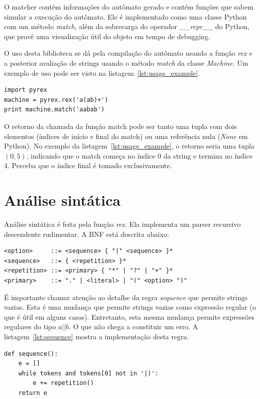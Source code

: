 \documentclass[a4paper,12pt,oneside,onecolumn]{uerj}
\begin{document}
O matcher contém informações do autômato gerado e contém funções que sabem simular a execução do autômato. Ele é implementado como uma classe Python com um método \emph{match}, além da sobrecarga do operador \emph{\_\_repr\_\_} do Python, que provê uma visualização útil do objeto em tempo de debugging.

O uso desta biblioteca se dá pela compilação do autômato usando a função \emph{rex} e a posterior avaliação de strings usando o método \emph{match} da classe \emph{Machine}. Um exemplo de uso pode ser visto na listagem~\ref{lst:usage_example}.

\vspace{0.5cm}
\begin{lstlisting}[caption={Exemplo de uso da biblioteca PyRex},label=lst:usage_example]
import pyrex
machine = pyrex.rex('a(ab)+')
print machine.match('aabab')
\end{lstlisting}

O retorno da chamada da função match pode ser tanto uma tupla com dois elementos (índices de início e final do match) ou uma referência nula (\emph{None} em Python). No exemplo da listagem~\ref{lst:usage_example}, o retorno seria uma tupla $(0, 5)$, indicando que o match começa no índice 0 da string e termina no índice 4. Perceba que o índice final é tomado exclusivamente.


\section{Análise sintática}

Análise sintática é feita pela função \emph{rex}. Ela implementa um parser recursivo descendente rudimentar. A BNF está descrita abaixo:

\begin{verbatim}
<option>     ::= <sequence> { "|" <sequence> }*
<sequence>   ::= { <repetition> }*
<repetition> ::= <primary> { "*" | "?" | "+" }*
<primary>    ::= "." | <literal> | "(" <option> ")"
\end{verbatim}

É importante chamar atenção ao detalhe da regra \emph{sequence} que permite strings vazias. Esta é uma mudança que permite strings vazias como expressão regular (o que é útil em alguns casos). Entretanto, esta mesma mudança permite expressões regulares do tipo $a||b$. O que não chega a constituir um erro. A listagem~\ref{lst:sequence} mostra a implementação desta regra.

\vspace{0.5cm}
\begin{lstlisting}[caption={Implementação da regra \emph{sequence}},label=lst:sequence]
def sequence():
    e = []
    while tokens and tokens[0] not in '|)':
        e += repetition()
    return e
\end{lstlisting}
\end{document}
